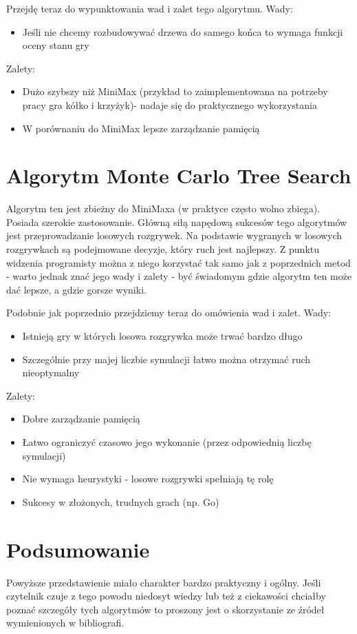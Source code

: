 \documentclass[polish,shortabstract,inz]{iithesis}
\begin{document}
Przejdę teraz do wypunktowania wad i zalet tego algorytmu.
\newline Wady:
\begin{itemize}
  \item Jeśli nie chcemy rozbudowywać drzewa do samego końca to wymaga funkcji oceny stanu gry
\end{itemize}
Zalety:
\begin{itemize}
  \item Dużo szybszy niż MiniMax (przykład to zaimplementowana na potrzeby pracy gra kółko i krzyżyk)- nadaje się do praktycznego wykorzystania
  \item W porównaniu do MiniMax lepsze zarządzanie pamięcią
\end{itemize}


\section{Algorytm Monte Carlo Tree Search}
Algorytm ten jest zbieżny do MiniMaxa (w praktyce często wolno zbiega). Posiada szerokie zastosowanie.
Główną siłą napędową sukcesów tego algorytmów jest przeprowadzanie losowych rozgrywek.
Na podstawie wygranych w losowych rozgrywkach są podejmowane decyzje, który ruch jest najlepszy.
Z punktu widzenia programisty można z niego korzystać tak samo jak z poprzednich metod - warto jednak znać jego wady i zalety - być świadomym gdzie algorytm ten może dać lepsze, a gdzie gorsze wyniki.

Podobnie jak poprzednio przejdziemy teraz do omówienia wad i zalet.
\newline Wady:
\begin{itemize}
  \item Istnieją gry w których losowa rozgrywka może trwać bardzo długo
  \item Szczególnie przy majej liczbie symulacji łatwo można otrzymać ruch nieoptymalny
\end{itemize}
Zalety:
\begin{itemize}
  \item Dobre zarządzanie pamięcią
  \item Łatwo ograniczyć czasowo jego wykonanie (przez odpowiednią liczbę symulacji)
  \item Nie wymaga heurystyki - losowe rozgrywki spełniają tę rolę
  \item Sukcesy w złożonych, trudnych grach (np. Go)
\end{itemize}

\section{Podsumowanie}
Powyższe przedstawienie miało charakter bardzo praktyczny i ogólny.
Jeśli czytelnik czuje z tego powodu niedosyt wiedzy lub też z ciekawości chciałby poznać szczegóły tych algorytmów to proszony jest o skorzystanie ze źródeł wymienionych w bibliografi.
\end{document}
